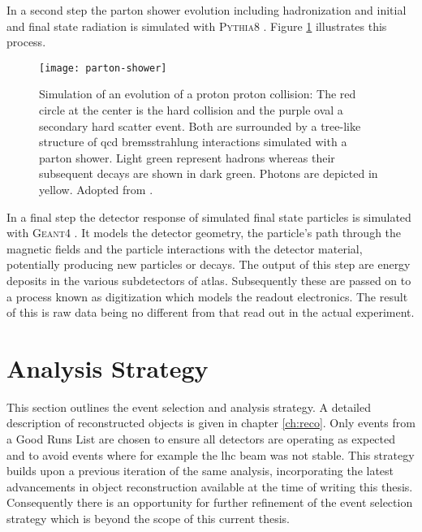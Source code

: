 In a second step the parton shower evolution including hadronization and initial and final state radiation is simulated with \textsc{Pythia8} \citep{Sjostrand:2014zea}. Figure \ref{fig:parton_shower} illustrates this process.
\begin{figure}[]
    \centering
    \texttt{[image: parton-shower]}
    \caption{Simulation of an evolution of a proton proton collision: The red circle at the center is the hard collision and the purple oval a secondary hard scatter event. Both are surrounded by a tree-like structure of \ac{qcd} bremsstrahlung interactions simulated with a parton shower. Light green represent hadrons whereas their subsequent decays are shown in dark green. Photons are depicted in yellow. Adopted from \citep{Hoche:2014rga}.
        \label{fig:parton_shower}}
\end{figure}

In a final step the detector response of simulated final state particles is simulated with \textsc{Geant}4 \citep{Agostinelli:2002hh}. It models the detector geometry, the particle's path through the magnetic fields and the particle interactions with the detector material, potentially producing new particles or decays. The output of this step are energy deposits in the various subdetectors of \ac{atlas}. Subsequently these are passed on to a process known as digitization which models the readout electronics. The result of this is raw data being no different from that read out in the actual experiment.

\section{Analysis Strategy}\label{sec:hh4b_analysis_strategy}
This section outlines the event selection and analysis strategy. A detailed description of reconstructed objects is given in chapter \ref{ch:reco}. Only events from a Good Runs List are chosen to ensure all detectors are operating as expected and to avoid events where for example the \ac{lhc} beam was not stable. This strategy builds upon a previous iteration of the same analysis, incorporating the latest advancements in object reconstruction available at the time of writing this thesis. Consequently there is an opportunity for further refinement of the event selection strategy which is beyond the scope of this current thesis.

